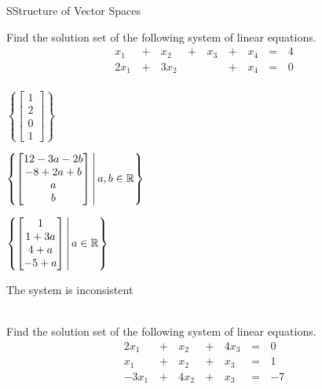 \documentclass{article}[12pt]
\begin{document}
\begin{module}{S}{Structure of Vector Spaces}
\begin{readinessAssuranceTest}
  \item Find the solution set of the following system of linear equations.
    \begin{alignat*}{5}
       x_1 &\,+\,& x_2 &\,+\,&  x_3 &\,+\,&  x_4 &\,=\,& 4 \\
       2x_1 &\,+\,& 3x_2 &\, \,&     &\,+\,&  x_4 &\,=\,& 0 \\
    \end{alignat*}
    \begin{multicols}{2}
    \begin{readinessAssuranceTestChoices}
    \item \(
  		  \left\{
            \begin{bmatrix}
              1 \\ 2 \\ 0 \\ 1
            \end{bmatrix}
  		  \right\}
          \)
  		\item \(
  		  \left\{
            \begin{bmatrix}
              12 -3a-2b \\ -8+2a+b \\ a \\ b
            \end{bmatrix}
  		  \,\middle|\,a,b \in \mathbb{R}\right\}
          \)   %
  		\item \(
  		  \left\{
            \begin{bmatrix}
              1 \\ 1 +3a\\ 4+a \\ -5+a
            \end{bmatrix}
  			\,\middle|\,a \in \mathbb{R}\right\}
          \)


    \item The system is inconsistent
    \ \\ \ \\
    \end{readinessAssuranceTestChoices}
    \end{multicols}
    \item Find the solution set of the following system of linear equations.
    \begin{alignat*}{4}
      2x_1 &\,+\,& x_2 &\,+\,& 4x_3 &\,=\,& 0 \\
       x_1 &\,+\,& x_2 &\,+\,&  x_3 &\,=\,& 1 \\
     -3x_1 &\,+\,& 4x_2 &\,+\,& x_3 &\,=\,& -7 \\
    \end{alignat*}


\end{readinessAssuranceTest}
\end{module}
\end{document}
